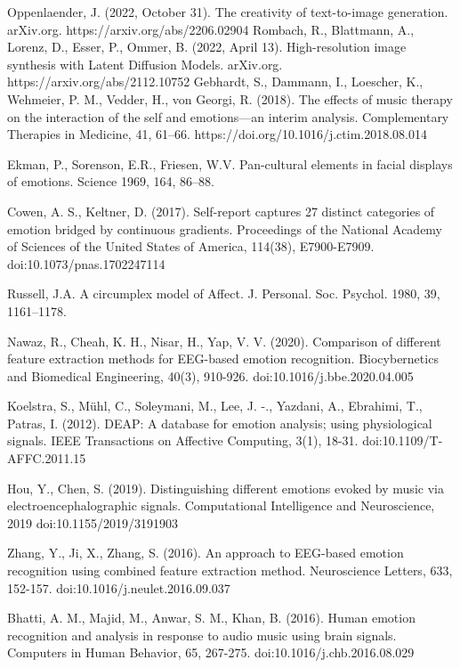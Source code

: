 \documentclass[14pt]{extreport}
\begin{document}
\begin{thebibliography}{20}
Oppenlaender, J. (2022, October 31). The creativity of text-to-image generation. arXiv.org. https://arxiv.org/abs/2206.02904 
Rombach, R., Blattmann, A., Lorenz, D., Esser, P., Ommer, B. (2022, April 13). High-resolution image synthesis with Latent Diffusion Models. arXiv.org. https://arxiv.org/abs/2112.10752 
Gebhardt, S., Dammann, I., Loescher, K., Wehmeier, P. M., Vedder, H., von Georgi, R. (2018). The effects of music therapy on the interaction of the self and emotions—an interim analysis. Complementary Therapies in Medicine, 41, 61–66. https://doi.org/10.1016/j.ctim.2018.08.014

Ekman, P., Sorenson, E.R., Friesen, W.V. Pan-cultural elements in facial displays of emotions. Science 1969,
164, 86–88.

Cowen, A. S., Keltner, D. (2017). Self-report captures 27 distinct categories of emotion bridged by continuous gradients. Proceedings of the National Academy of Sciences of the United States of America, 114(38), E7900-E7909. doi:10.1073/pnas.1702247114

Russell, J.A. A circumplex model of Affect. J. Personal. Soc. Psychol. 1980, 39, 1161–1178. 


Nawaz, R., Cheah, K. H., Nisar, H., Yap, V. V. (2020). Comparison of different feature extraction methods for EEG-based emotion recognition. Biocybernetics and Biomedical Engineering, 40(3), 910-926. doi:10.1016/j.bbe.2020.04.005

Koelstra, S., Mühl, C., Soleymani, M., Lee, J. -., Yazdani, A., Ebrahimi, T., Patras, I. (2012). DEAP: A database for emotion analysis; using physiological signals. IEEE Transactions on Affective Computing, 3(1), 18-31. doi:10.1109/T-AFFC.2011.15

Hou, Y., Chen, S. (2019). Distinguishing different emotions evoked by music via electroencephalographic signals. Computational Intelligence and Neuroscience, 2019 doi:10.1155/2019/3191903 

Zhang, Y., Ji, X., Zhang, S. (2016). An approach to EEG-based emotion recognition using combined feature extraction method. Neuroscience Letters, 633, 152-157. doi:10.1016/j.neulet.2016.09.037

Bhatti, A. M., Majid, M., Anwar, S. M., Khan, B. (2016). Human emotion recognition and analysis in response to audio music using brain signals. Computers in Human Behavior, 65, 267-275. doi:10.1016/j.chb.2016.08.029


\end{thebibliography}
\end{document}
